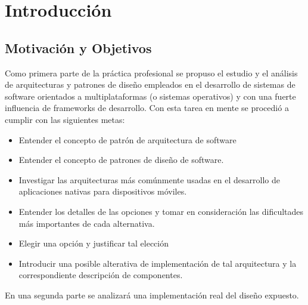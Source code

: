 
\chapter{Introducción} %

\label{Chapter1} %


\section{Motivación y Objetivos}
Como primera parte de la práctica profesional se propuso el estudio y el análisis de arquitecturas y patrones de diseño empleados en el desarrollo de sistemas de software orientados a multiplataformas (o sistemas operativos) y con una fuerte influencia de frameworks de desarrollo.
Con esta tarea en mente se procedió a cumplir con las siguientes metas:

\begin{itemize}
	\item Entender el concepto de patrón de arquitectura de software
	\item Entender el concepto de patrones de diseño de software.
	\item Investigar las arquitecturas más comúnmente usadas en el desarrollo de aplicaciones nativas para dispositivos móviles.
	\item Entender los detalles de las opciones y tomar en consideración las dificultades más importantes de cada alternativa.
	\item Elegir una opción y justificar tal elección
	\item Introducir una posible alterativa de implementación de tal arquitectura y la correspondiente descripción de componentes.
	 
\end{itemize}

En una segunda parte se analizará una implementación real del diseño expuesto.

